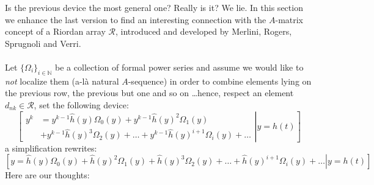 \documentclass[11pt,a4paper]{article} %
\begin{document}
    Is the previous device the most general one? Really is it? 
    We lie. In this section we enhance the last version to 
    find an interesting connection with 
    the $A$-matrix concept of a Riordan array $\mathcal{R}$, 
    introduced and developed by Merlini, Rogers, Sprugnoli and Verri.
    \\\\
    Let $\lbrace\Omega_{i}\rbrace_{i\in\mathbb{N}}$ be a collection of formal
    power series and assume we would like to \emph{not} localize them (a-l\`a natural 
    $A$-sequence) in order to combine elements lying on the previous row, the previous
    but one and so on \ldots hence, respect an element $d_{nk}\in\mathcal{R}$,
    set the following device:
    \begin{displaymath}
        \left.\left[
                \begin{split}
                    y^{k} &= y^{k-1}\hat{h}(y) \Omega_{0}(y) + 
                    y^{k-1}\hat{h}(y)^{2} \Omega_{1}(y) \\
                    &+ y^{k-1}\hat{h}(y)^{3} \Omega_{2}(y) +
                    \ldots +
                    y^{k-1}\hat{h}(y)^{i+1} \Omega_{i}(y) + \ldots
                \end{split}
            \right| y = h(t) \right]
    \end{displaymath}
    a simplification rewrites:
    \begin{displaymath}
        \left.\left[
            y = \hat{h}(y) \Omega_{0}(y) + 
            \hat{h}(y)^{2} \Omega_{1}(y) + \hat{h}(y)^{3} \Omega_{2}(y) +
            \ldots +
            \hat{h}(y)^{i+1} \Omega_{i}(y) + \ldots
            \right| y = h(t) \right]
    \end{displaymath}
    Here are our thoughts:
\end{document}
